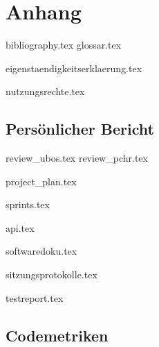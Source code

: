 \part*{Anhang}

\begin{comment}
In den Anhang gehört: Formulare (z.B. Eigenständigkeitserklärung, Nutzungsrechte, ...), Persönliche Reflektion, Projektplanung inkl. Risiko-Listen (Dokumentation der Versionen nach jeder Iteration), Zeitabrechnung nach sinnvollen Kategorien, Sitzungsprotokolle - das sind alles HSR-internen, nicht publizierte Dokumentationselemente (Abgabe nur für die Bewertung und Archivierung, in einer PDF-Datei)
\end{comment}

{bibliography.tex}
{glossar.tex}

{eigenstaendigkeitserklaerung.tex}

{nutzungsrechte.tex}

\chapter{Persönlicher Bericht}
{review_ubos.tex}
{review_pchr.tex}

{project_plan.tex}

{sprints.tex}

{api.tex}

{softwaredoku.tex}

{sitzungsprotokolle.tex}

{testreport.tex}

\chapter{Codemetriken} \label{appendix:code-metrics}

\xxx[]